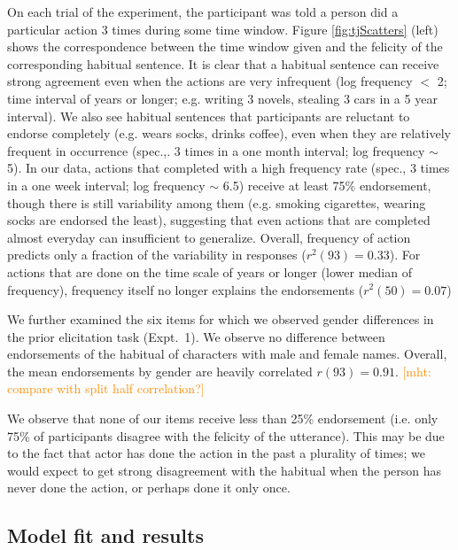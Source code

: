\documentclass[10pt,letterpaper]{article}
\newcommand{\mht}[1]{\textcolor{DarkOrange}{[mht: #1]}}
\begin{document}
On each trial of the experiment, the participant was told a person did a particular action 3 times during some time window. 
Figure \ref{fig:tjScatters} (left) shows the correspondence between the time window given and the felicity of the corresponding habitual sentence. 
It is clear that a habitual sentence can receive strong agreement even when the actions are very infrequent (log frequency $<$ 2; time interval of years or longer; e.g. writing 3 novels, stealing 3 cars in a 5 year interval).
We also see habitual sentences that participants are reluctant to endorse completely (e.g. wears socks, drinks coffee), even when they are relatively frequent in occurrence (spec.,. 3 times in a one month interval; log frequency $\sim$ 5).
In our data, actions that completed with a high frequency rate (spec., 3 times in a one week interval; log frequency $\sim$ 6.5) receive at least 75\% endorsement, though there is still variability among them (e.g. smoking cigarettes, wearing socks are endorsed the least), suggesting that even actions that are completed almost everyday can insufficient to generalize.
Overall, frequency of action predicts only a fraction of the variability in responses ($r^2(93) = 0.33$).
For actions that are done on the time scale of years or longer (lower median of frequency), frequency itself no longer explains the endorsements ($r^2(50) = 0.07$)

We further examined the six items for which we observed gender differences in the prior elicitation task (Expt.~1).
We observe no difference between endorsements of the habitual of characters with male and female names. 
Overall, the mean endorsements by gender are heavily correlated $r(93) = 0.91$. \mht{compare with split half correlation?}

We observe that none of our items receive less than 25\% endorsement (i.e. only 75\% of participants disagree with the felicity of the utterance).
This may be due to the fact that actor has done the action in the past a plurality of times; we would expect to get strong disagreement with the habitual when the person has never done the action, or perhaps done it only once.

\subsection{Model fit and results}
\end{document}
